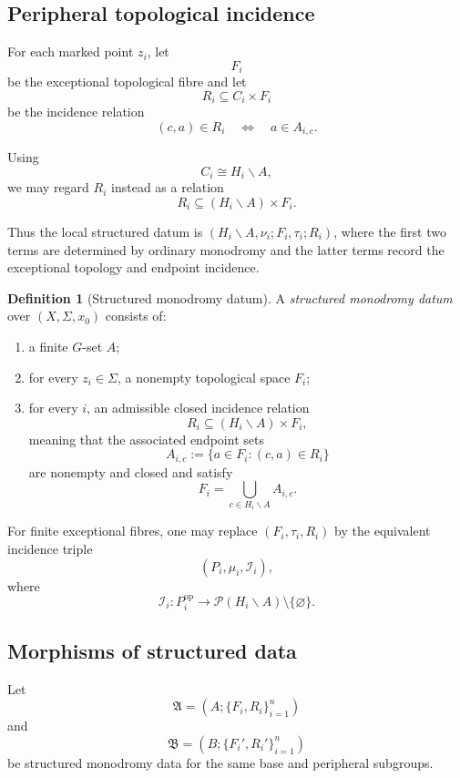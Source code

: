 \documentclass[11pt]{article}
\theoremstyle{plain}
\theoremstyle{definition}
\newtheorem{definition}[theorem]{Definition}
\begin{document}
\subsection{Peripheral topological incidence}
\label{subsec:peripheral-topological-incidence}

For each marked point $z_i$, let
\[
F_i
\]
be the exceptional topological fibre and let
\[
R_i\subseteq C_i\times F_i
\]
be the incidence relation
\[
(c,a)\in R_i
\quad\Longleftrightarrow\quad
a\in A_{i,c}.
\]

Using
\[
C_i\cong H_i\backslash A,
\]
we may regard $R_i$ instead as a relation
\[
R_i
\subseteq
(H_i\backslash A)\times F_i.
\]

Thus the local structured datum is $(H_i\backslash A,\nu_i;F_i,\tau_i;R_i)$, where the first two terms are determined by ordinary monodromy and the latter terms record the exceptional topology and endpoint incidence.

\begin{definition}[Structured monodromy datum]
\label{def:structured-monodromy-datum}
A \emph{structured monodromy datum} over $(X,\Sigma,x_0)$ consists of:
\begin{enumerate}[label=(\roman*)]
\item a finite $G$-set $A$;
\item for every $z_i\in\Sigma$, a nonempty topological space $F_i$;
\item for every $i$, an admissible closed incidence relation
\[
R_i\subseteq(H_i\backslash A)\times F_i,
\]
meaning that the associated endpoint sets
\[
A_{i,c}
:=
\{a\in F_i:(c,a)\in R_i\}
\]
are nonempty and closed and satisfy
\[
F_i=\bigcup_{c\in H_i\backslash A}A_{i,c}.
\]
\end{enumerate}
\end{definition}

For finite exceptional fibres, one may replace $(F_i,\tau_i,R_i)$ by the
equivalent incidence triple
\[
(P_i,\mu_i,\mathcal I_i),
\]
where
\[
\mathcal I_i:
P_i^{\mathrm{op}}
\longrightarrow
\mathcal P(H_i\backslash A)\setminus\{\varnothing\}.
\]


\subsection{Morphisms of structured data}
\label{subsec:structured-morphisms}

Let
\[
\mathfrak A
=
\left(
A;\{F_i,R_i\}_{i=1}^n
\right)
\]
and
\[
\mathfrak B
=
\left(
B;\{F_i',R_i'\}_{i=1}^n
\right)
\]
be structured monodromy data for the same base and peripheral
subgroups.
\end{document}
